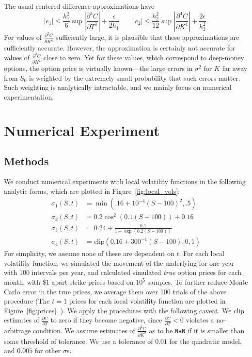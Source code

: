 \documentclass[11pt]{article}
\numberwithin{equation}{section}
\newcommand{\diff}[2]{\frac{\partial #1}{\partial #2}}
\newcommand{\abs}[1]{\left|#1\right|}
\begin{document}
The usual centered difference approximations have
\[
|e_1|\le \frac{h_1^2}{6}\sup \abs{\diff{^3C}{T^3}} + \frac{\epsilon}{2h_1}
\qquad |e_2| \le \frac{h_2^2}{12}\sup \abs{\diff{^4C}{K^4}} +
\frac{2\epsilon}{h_2^2}.
\]
For values of $\diff{^2C}{K^2}$ sufficiently large, it is plausible that these
approximations are sufficiently accurate. However, the approximation is
certainly not accurate for values of $\diff{^2C}{K^2}$ close to zero. Yet for
these values, which correspond to deep-money options, the option price is
virtually known---the large errors in $\sigma^2$ for $K$ far away from $S_0$ is
weighted by the extremely small probability that such errors matter. Such
weighting is analytically intractable, and we mainly focus on numerical
experimentation. 
 
 
\section{Numerical Experiment}
\label{sec:numericalexp}

\subsection{Methods}
We conduct numerical experiments with local volatility functions in the following analytic forms, which are plotted in Figure~\ref{fig:local_vols}: \begin{align*}
\sigma_1(S,t) &= \min(.16 + 10^{-4}(S-100)^2, .5) \tag{Quadratic}\\
\sigma_2(S,t) &= 0.2\cos^2(0.1(S-100)) + 0.16 \tag{Sinusoidal}\\
\sigma_3(S,t) &= 0.24 + \frac{0.1}{1+\exp(0.2(S-100))} \tag{Logistic} \\
\sigma_4(S,t) &= \text{clip}(0.16 + 300^{-1}(S - 100),0,1) \tag{Linear}
\end{align*}
For simplicity, we assume none of these are dependent on $t$. For each local volatility function, we simulated the movement of the underlying for one year with 100 intervals per year, and calculated simulated \emph{true} option prices for each month, with \$1 apart strike prices based on $10^5$ samples. To further reduce Monte Carlo error in the true prices, we average them over 100 trials of the above procedure (The $t=1$ prices for each local volatility function are plotted in Figure~\ref{fig:prices}.
). We apply the procedures with the following caveat. We clip estimates of $\diff{C}{T}$ to zero if they become negative, since $\diff{C}{T} < 0$ violates a no-arbitrage condition. We assume estimates of $\diff{^2C}{K^2}$ as to be \texttt{NaN} if it is smaller than some threshold of tolerance. We use a tolerance of $0.01$ for the quadratic model, and $0.005$ for other $\sigma$s. 
 
\end{document}
